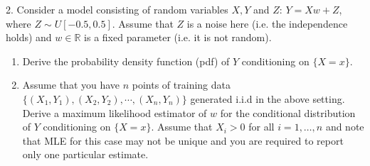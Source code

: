 2. Consider a model consisting of random variables $X, Y$ and $Z$: $Y = Xw + Z$, where $Z \sim U[-0.5, 0.5]$. Assume that $Z$ is a noise here (i.e. the independence holds) and $w \in \mathbb{R}$ is a fixed parameter (i.e. it is not random).

\begin{enumerate}
    \item {} Derive the probability density function (pdf) of $Y$ conditioning on $\{X = x\}$.
	
    \item {} Assume that you have $n$ points of training data $\{(X_{1},Y_{1}), (X_{2}, Y_{2}), \cdots, (X_{n}, Y_{n})\}$ generated i.i.d in the above setting. Derive a maximum likelihood estimator of $w$ for the conditional distribution of $Y$ conditioning on $\{X = x\}$. Assume that $X_{i} > 0$ for all $i = 1, \ldots, n$ and note that MLE for this case may not be unique and you are required to report only one particular estimate.
	
\end{enumerate}
